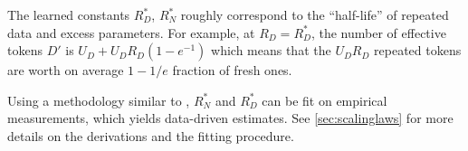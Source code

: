 \documentclass{article}
\begin{document}
The learned constants $R^*_D$, $R^*_N$ roughly correspond to the ``half-life'' of repeated data and excess parameters. For example, at $R_D=R^*_D$, the number of effective tokens $D'$ is 
$U_D+ U_DR_D(1-e^{-1})$ which means that the $U_DR_D$ repeated tokens are worth on average $1-1/e$ fraction of fresh ones.

Using a methodology similar to \cite{hoffmann2022training}, $R_N^*$ and $R_D^*$ can be fit on empirical measurements, which yields data-driven estimates. See \autoref{sec:scalinglaws} for more details on the derivations and the fitting procedure. 






\end{document}
